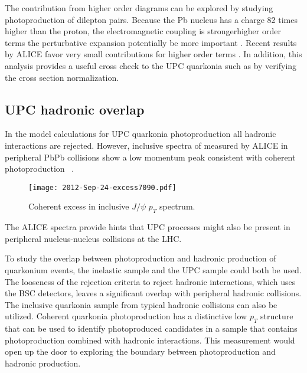       The contribution from higher order diagrams can be explored by studying 
        photoproduction of dilepton pairs.
      Because the Pb nucleus has a charge 82 times higher than \DIFaddbegin {}\DIFaddend the 
        proton, the electromagnetic coupling is stronger\DIFdelbegin {}\DIFdelend \DIFaddbegin {}\DIFaddend higher order terms \DIFdelbegin {}\DIFdelend \DIFaddbegin {}\DIFaddend the perturbative expansion \DIFdelbegin {}\DIFdelend \DIFaddbegin {}\DIFaddend potentially 
        be more important \DIFdelbegin {}\DIFdelend \DIFaddbegin {}\DIFaddend .
      Recent results by ALICE favor very small contributions for higher order
        terms \DIFdelbegin \DIFdel{\mbox{%
\cite{}
}%
}\DIFdelend \DIFaddbegin {}\DIFaddend .
      In addition, this analysis provides a useful cross check to the UPC 
        quarkonia \DIFdelbegin {}\DIFdelend \DIFaddbegin {}\DIFaddend such as \JPsi{} by verifying the cross section 
        normalization.

    \subsection{UPC hadronic overlap}
      In the model calculations for UPC quarkonia 
        photoproduction all hadronic interactions are rejected.
      However, inclusive \pt{} spectra of \JPsi{} measured by ALICE in 
        peripheral PbPb collisions show a low momentum peak consistent with 
        coherent photoproduction ~\cite{aliceIclJpsi}.
      \begin{figure}[h]
        \centering
        \texttt{[image: 2012-Sep-24-excess7090.pdf]}
        \caption{Coherent excess in inclusive $J/\psi$ $p_{T}$ spectrum.}
        \label{fig:alicePtSpecLowPt}
      \end{figure}
      The ALICE spectra provide hints that UPC processes might also be present 
        in peripheral nucleus-nucleus collisions at the LHC.

      To study the overlap between photoproduction and hadronic production of 
        quarkonium events, the inelastic sample and the UPC sample could both be
        used. 
      The looseness of the rejection criteria to reject hadronic interactions,
        which uses the BSC detectors, leaves a significant overlap with 
        peripheral hadronic collisions. 
      The inclusive quarkonia sample from typical hadronic collisions can also 
        be utilized. 
      Coherent quarkonia photoproduction has a distinctive low $p_{T}$ structure
        that can be used to identify photoproduced candidates in a sample that 
        contains photoproduction combined with hadronic interactions.
      This measurement would open up the door to exploring the boundary between
        photoproduction and hadronic production.

